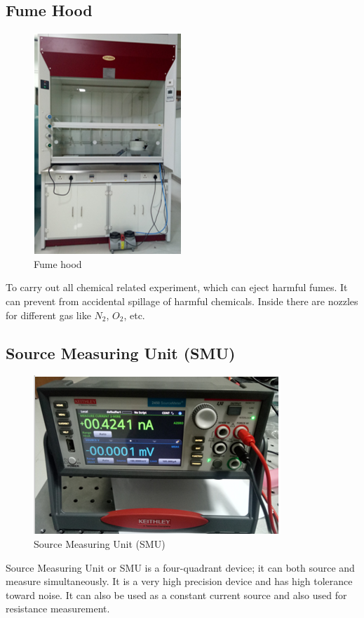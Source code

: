 \documentclass[12pt,a4paper,bold]{thesis}
\theoremstyle{thm}
\theoremstyle{definition}
\begin{document}
\subsection{Fume Hood}
\begin{figure}[H]
	\centering
   \includegraphics[scale=0.56]{Images/13.png} 
   \caption{Fume hood}
\end{figure}
To carry out all chemical related experiment, which can eject harmful fumes. It can prevent from accidental spillage of harmful chemicals. Inside there are nozzles for different gas like $N_2$, $O_2$, etc. 

\subsection{Source Measuring Unit (SMU)}
\begin{figure}[H]
	\centering
   \includegraphics[scale=0.56]{Images/14.png} 
   \caption{Source Measuring Unit (SMU)}
\end{figure}
Source Measuring Unit or SMU is a four-quadrant device; it can both source and measure simultaneously. It is a very high precision device and has high tolerance toward noise. It can also be used as a constant current source and also used for resistance measurement.
\end{document}
